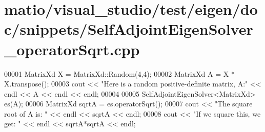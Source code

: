 \hypertarget{matio_2visual__studio_2test_2eigen_2doc_2snippets_2_self_adjoint_eigen_solver__operator_sqrt_8cpp_source}{}\section{matio/visual\+\_\+studio/test/eigen/doc/snippets/\+Self\+Adjoint\+Eigen\+Solver\+\_\+operator\+Sqrt.cpp}
\label{matio_2visual__studio_2test_2eigen_2doc_2snippets_2_self_adjoint_eigen_solver__operator_sqrt_8cpp_source}

\begin{DoxyCode}
00001 MatrixXd X = MatrixXd::Random(4,4);
00002 MatrixXd A = X * X.transpose();
00003 cout << \textcolor{stringliteral}{"Here is a random positive-definite matrix, A:"} << endl << A << endl << endl;
00004 
00005 SelfAdjointEigenSolver<MatrixXd> es(A);
00006 MatrixXd sqrtA = es.operatorSqrt();
00007 cout << \textcolor{stringliteral}{"The square root of A is: "} << endl << sqrtA << endl;
00008 cout << \textcolor{stringliteral}{"If we square this, we get: "} << endl << sqrtA*sqrtA << endl;
\end{DoxyCode}
